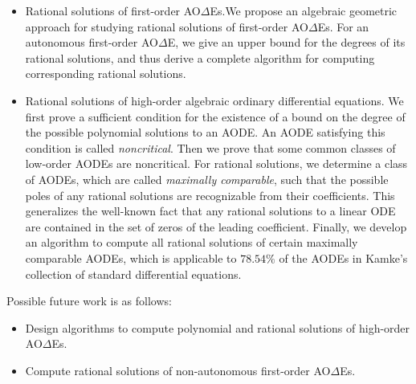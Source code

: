 \documentclass[10pt,a4paper]{article}
\newcommand{\AODE}{{AO{$\Delta$}E}}
\newcommand{\AODEs}{{AO{$\Delta$}Es}}
\begin{document}
\begin{itemize}
\item Rational solutions of first-order \AODEs.We propose an algebraic geometric approach for studying rational solutions of first-order \AODEs. 
For an autonomous first-order \AODE, we give an upper bound for the degrees of its rational solutions, and thus derive a complete algorithm for 
computing corresponding rational solutions.

\item  Rational solutions of high-order algebraic ordinary differential equations. 
We first prove a sufficient condition for the existence of a bound on the degree of the possible polynomial solutions to an AODE.
An AODE satisfying this condition is called \emph{noncritical}. 
Then we prove that some common classes of low-order AODEs are noncritical.
For rational solutions, we determine a class of AODEs, which are called \emph{maximally comparable}, 
such that the possible poles of any rational solutions are recognizable from their coefficients. 
This generalizes the well-known fact that any rational solutions to a linear ODE are contained in the set of zeros of the leading coefficient.
Finally, we develop an algorithm to compute all rational solutions of certain maximally comparable AODEs, 
which is applicable to $78.54\%$ of the AODEs in Kamke's collection of standard differential equations.
\end{itemize}

Possible future work is as follows: 

\begin{itemize}
\item  Design algorithms to compute polynomial and rational solutions of high-order \AODEs.
\item Compute rational solutions of non-autonomous first-order \AODEs. 
\end{itemize}	
\end{document}
